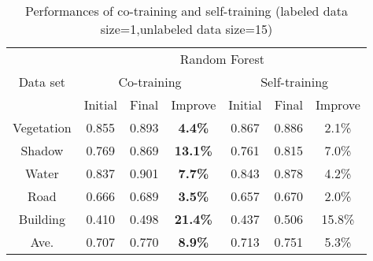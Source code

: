 \documentclass{article}
\begin{document}
\begin{table}[]
\begin{center}
\begin{tabular}{c|ccc|ccc}
\toprule
\multirow{3}{*}{Data set} & \multicolumn{6}{c}{Random Forest}                                  \\
\cline{2-7}
                          & \multicolumn{3}{c|}{Co-training}      & \multicolumn{3}{c}{Self-training} \\
\cline{2-7}
                          & Initial & Final & Improve         & Initial   & Final   & Improve  \\
\midrule
Vegetation                & 0.855    & 0.893  & \textbf{4.4\%}  & 0.867      & 0.886    & 2.1\%   \\
Shadow                    & 0.769    & 0.869  & \textbf{13.1\%} & 0.761      & 0.815    & 7.0\%   \\
Water                     & 0.837    & 0.901  & \textbf{7.7\%}  & 0.843      & 0.878    & 4.2\%   \\
Road                      & 0.666    & 0.689  & \textbf{3.5\%}  & 0.657      & 0.670    & 2.0\%    \\
Building                  & 0.410    & 0.498  & \textbf{21.4\%} & 0.437      & 0.506    & 15.8\%    \\
\midrule
Ave.                      & 0.707    & 0.770  & \textbf{8.9\%}  & 0.713      & 0.751    & 5.3\%   \\
\bottomrule
\end{tabular}
\caption{Performances of co-training and self-training (labeled data size=1,unlabeled data size=15)}
\end{center}
\end{table}
\end{document}
